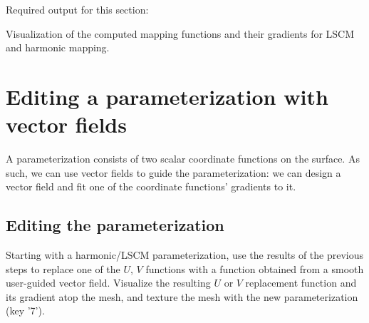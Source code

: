 \documentclass[11pt]{amsart}
\newcommand{\itemz}[1]{{\begin{itemize}{#1}\end{itemize}}}
\begin{document}
Required output for this section:
\itemz{
\item{Visualization of the computed mapping functions and their gradients for
    LSCM and harmonic mapping.}
}
\vspace{-5mm}
\section{Editing a parameterization with vector fields}
A parameterization consists of two scalar coordinate functions on the surface.
As such, we can use vector fields to guide the parameterization: we can design
a vector field and fit one of the coordinate functions' gradients to it.

\subsection {Editing the parameterization}
Starting with a harmonic/LSCM parameterization, use the results of the previous
steps to replace one of the $U$, $V$ functions with a function obtained from a
smooth user-guided vector field. Visualize the resulting $U$ or $V$ replacement
function and its gradient atop the mesh, and texture the mesh with the new
parameterization (key '7').
\end{document}
